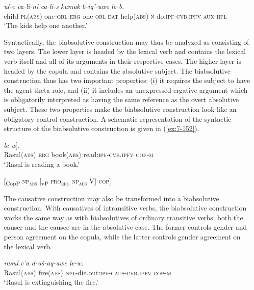 ﻿\documentclass[output=paper]{langsci/langscibook}
\begin{document}
\pagebreak

\ea\label{ex:7-151}
\gll \emph{ul-e} \emph{ca-li-ni} \emph{ca-li-s} \emph{kumak} \emph{b-iq'-uwe} \emph{le-b}.\\
child-\textsc{pl}(\textsc{abs}) one-\textsc{obl}-\textsc{erg} one-\textsc{obl}-\textsc{dat} help(\textsc{abs}) \textsc{n}-do:\textsc{ipf}-\textsc{cvb.ipfv} \textsc{aux}-\textsc{hpl}\\
\glt `The kids help one another.'
\z

Syntactically, the biabsolutive construction may thus be analyzed as
consisting of two layers. The lower layer is headed by the lexical verb
and contains the lexical verb itself and all of its arguments in their
respective cases. The higher layer is headed by the copula and contains
the absolutive subject. The biabsolutive construction thus has two
important properties: (i) it requires the subject to have the agent
theta-role, and (ii) it includes an unexpressed ergative argument which
is obligatorily interpreted as having the same reference as the overt
absolutive subject. These two properties make the biabsolutive
construction look like an obligatory control construction. A schematic
representation of the syntactic structure of the biabsolutive
construction is given in (\ref{ex:7-152}).

\ea\label{ex:7-152}
\ea %
\gll [\emph{rasul\textsubscript{i}} [\textsc{pro}\textsubscript{i} \emph{kung} \emph{luč'-uwe}] \emph{le-w}].\\
Rasul(\textsc{abs}) \textsc{erg} book(\textsc{abs}) read:\textsc{ipf}-\textsc{cvb.ipfv} \textsc{cop}-\textsc{m}\\
\glt `Rasul is reading a book.'

\ex %
{}[\textsubscript{CopP} \textsc{np\textsubscript{abs}} [\textsubscript{vP} \textsc{pro\textsubscript{erg}} \textsc{np\textsubscript{abs}} V] \textsc{cop}]
\z
\z

The causative construction may also be transformed into a biabsolutive
construction. With causatives of intransitive verbs, the biabsolutive
construction works the same way as with biabsolutives of ordinary
transitive verbs: both the causer and the causee are in the absolutive
case. The former controls gender and person agreement on the copula,
while the latter controls gender agreement on the lexical verb.

\ea %
\gll \emph{rasul} \emph{c'a} \emph{d-uš-aq-uwe} \emph{le-w.}\\ 
Rasul(\textsc{abs}) fire(\textsc{abs}) \textsc{npl}-die.out:\textsc{ipf}-\textsc{caus}-\textsc{cvb.ipfv} \textsc{cop}-\textsc{m}\\
\glt `Rasul is extinguishing the fire.'
\z
\end{document}
